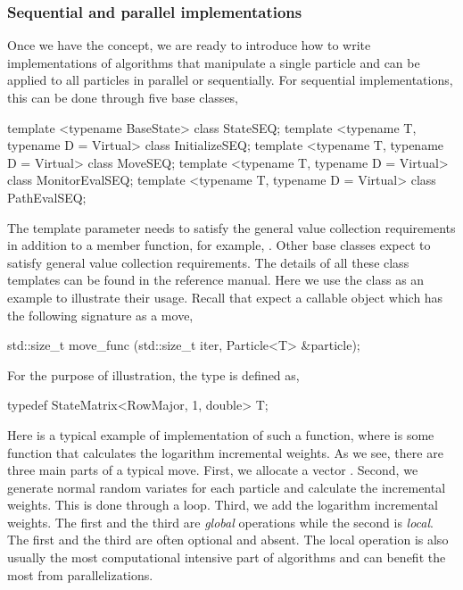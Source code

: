 \subsubsection{Sequential and parallel implementations}
\label{ssub:Sequential and parallel implementations}

Once we have the  concept, we are ready to introduce
how to write implementations of \smc algorithms that manipulate a single
particle and can be applied to all particles in parallel or sequentially. For
sequential implementations, this can be done through five base classes,
\begin{cppcode}
template <typename BaseState> class StateSEQ;
template <typename T, typename D = Virtual> class InitializeSEQ;
template <typename T, typename D = Virtual> class MoveSEQ;
template <typename T, typename D = Virtual> class MonitorEvalSEQ;
template <typename T, typename D = Virtual> class PathEvalSEQ;
\end{cppcode}
The template parameter  needs to satisfy the general value
collection requirements in addition to a  member function,
for example, . Other base classes expect  to satisfy
general value collection requirements. The details of all these class
templates can be found in the reference manual. Here we use the
 class as an example to illustrate their usage. Recall that
 expect a callable object which has the following signature
as a move,
\begin{cppcode}
std::size_t move_func (std::size_t iter, Particle<T> &particle);
\end{cppcode}
For the purpose of illustration, the type  is defined as,
\begin{cppcode}
typedef StateMatrix<RowMajor, 1, double> T;
\end{cppcode}
Here is a typical example of implementation of such a function,
where  is some function that calculates the logarithm
incremental weights. As we see, there are three main parts of a typical move.
First, we allocate a vector . Second, we generate normal
random variates for each particle and calculate the incremental weights. This
is done through a  loop. Third, we add the logarithm incremental
weights. The first and the third are \emph{global} operations while the second
is \emph{local}. The first and the third are often optional and absent. The
local operation is also usually the most computational intensive part of \smc
algorithms and can benefit the most from parallelizations.

